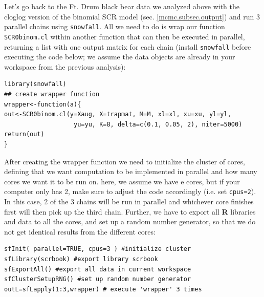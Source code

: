 Let's go back to the Ft. Drum black bear data we analyzed above with the cloglog version of the binomial SCR model (sec. \ref{mcmc.subsec.output}) and run 3 parallel chains using {\tt snowfall}. All we need to do is wrap our function {\tt SCR0binom.cl} within another function that can then be executed in parallel, returning a list with one output matrix for each chain (install {\tt snowfall} before executing the code below; we assume the data objects are already in your workspace from the previous analysis):

{\small
\begin{verbatim} 
library(snowfall) 
## create wrapper function
wrapper<-function(a){
out<-SCR0binom.cl(y=Xaug, X=trapmat, M=M, xl=xl, xu=xu, yl=yl, 
                   yu=yu, K=8, delta=c(0.1, 0.05, 2), niter=5000)
return(out)
}
\end{verbatim}
}

After creating the wrapper function we need to initialize the cluster of cores, defining that we want computation to be implemented in parallel and how many cores we want it to be run on. here, we assume we have e cores, but if your computer only has 2, make sure to adjust the code accordingly (i.e. set {\tt cpus=2}). In this case, 2 of the 3 chains will be run in parallel and whichever core finishes first will then pick up the third chain. Further, we have to export all {\bf R} libraries and data to all the cores, and set up a random number generator, so that we do not get identical results from the different cores:

{\small
\begin{verbatim} 
sfInit( parallel=TRUE, cpus=3 ) #initialize cluster
sfLibrary(scrbook) #export library scrbook
sfExportAll() #export all data in current workspace
sfClusterSetupRNG() #set up random number generator
outL=sfLapply(1:3,wrapper) # execute 'wrapper' 3 times
\end{verbatim}
}

